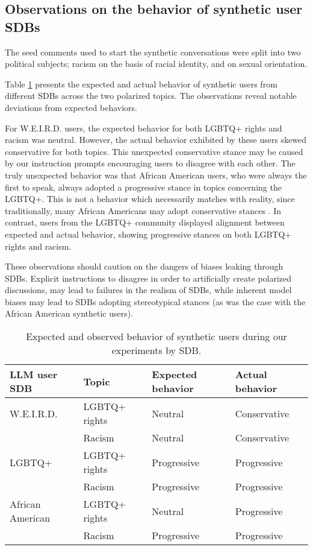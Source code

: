 \subsection{Observations on the behavior of synthetic user SDBs}

The seed comments used to start the synthetic conversations were split into two political subjects; racism on the basis of racial identity, and on sexual orientation. 

Table \ref{tab:user-sdb-behavior} presents the expected and actual behavior of synthetic users from different \acp{SDB} across the two polarized topics. The observations reveal notable deviations from expected behaviors.

For \ac{W.E.I.R.D.} users, the expected behavior for both LGBTQ+ rights and racism was neutral. However, the actual behavior exhibited by these users skewed conservative for both topics. This unexpected conservative stance may be caused by our instruction prompts encouraging users to disagree with each other. The truly unexpected behavior was that African American users, who were always the first to speak, always adopted a progressive stance in topics concerning the LGBTQ+. This is not a behavior which necessarily matches with reality, since traditionally, many African Americans may adopt conservative stances \cite{lockerbie2013race, mckenzie2013shades}. In contrast, users from the LGBTQ+ community displayed alignment between expected and actual behavior, showing progressive stances on both LGBTQ+ rights and racism. 

These observations should caution on the dangers of biases leaking through \acp{SDB}. Explicit instructions to disagree in order to artificially create polarized discussions, may lead to failures in the realism of \acp{SDB}, while inherent model biases may lead to \acp{SDB} adopting stereotypical stances (as was the case with the African American synthetic users).

\begin{table}
	\begin{tabular}
		{ |p{3cm}|p{3cm}|p{3cm}|p{3cm}|}
		\hline
		\cellcolor{blue!25}\textbf{LLM user SDB} & \cellcolor{blue!25}\textbf{Topic} & \cellcolor{blue!25}\textbf{Expected behavior} & \cellcolor{blue!25}\textbf{Actual behavior}\\
		\hline
		\ac{W.E.I.R.D.} & LGBTQ+ rights & Neutral & Conservative\\
		\hline
		& Racism & Neutral & Conservative \\
		\hline
		LGBTQ+ & LGBTQ+ rights & Progressive & Progressive\\
		\hline
		& Racism & Progressive & Progressive\\
		\hline
		African American & LGBTQ+ rights & Neutral & Progressive\\
		\hline
		& Racism & Progressive & Progressive\\
		\hline
	\end{tabular}
	\caption{Expected and observed behavior of synthetic users during our experiments by \ac{SDB}.}
	\label{tab:user-sdb-behavior}
\end{table}

